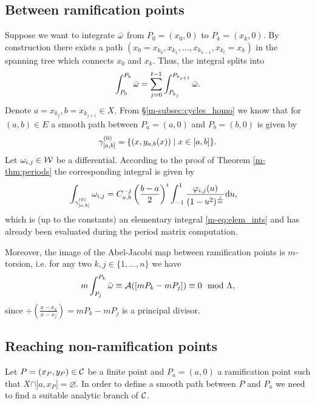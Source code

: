 \documentclass[main.tex]{subfiles}
\begin{document}
  \subsection{Between ramification points}\label{subsec:ajm_ram_pts}

  Suppose we want to integrate $\bar{\omega}$ from $P_0 =(x_0,0)$ to $P_k = (x_k,0)$. By construction there exists a path
 $(x_0=x_{k_0},x_{k_1},\dots,x_{k_{n-1}},x_{k_t}=x_k)$ in the spanning tree which connects $x_0$ and $x_k$. Thus, the integral splits into
  \begin{align*}
    \int_{P_0}^{P_k} \bar{\omega} = \sum_{j = 0}^{t-1}  \int_{P_{k_j}}^{P_{k_{j+1}}} \bar{\omega}.
  \end{align*}
  Denote $a = x_{k_j}, b = x_{k_{j+1}} \in X$. From \S \ref{m-subsec:cycles_homo} we know that for $(a,b) \in E$ a smooth path between $P_a=(a,0)$ and $P_b=(b,0)$ is given by
  \begin{align*}
   \gamma_{[a,b]}^{(0)} = \{  (x,y_{a,b}(x))  \mid  x \in [a,b]  \}.
  \end{align*}
  Let $\omega_{i,j} \in \mathcal{W}$ be a differential. According to the proof of Theorem \ref{m-thm:periods} the corresponding integral is given by
  \begin{align*}
   \int_{\gamma_{[a,b]}^{(0)}} \omega_{i,j}  & =
   C_{a,b}^{-j} \left(\frac{b-a}{2}\right)^i \int_{-1}^1 \frac{\varphi_{i,j}(u)}{(1-u^2)^{\frac{j}{m}}}  \mathrm d u,
  \end{align*}
  which is (up to the constants) an elementary integral \ref{m-eq:elem_ints}
  and has already been evaluated during the period matrix computation.

  \begin{rmk}
  Moreover, the image of the Abel-Jacobi map between ramification points is $m$-torsion, i.e. for any two $k,j \in \{1,\dots,n\}$ we have
  \begin{equation}\label{eq:m_tors}
    m \int_{P_j}^{P_k} \bar{\omega} \equiv \mathcal{A}( [ mP_k - mP_j ] ) \equiv 0 \mod  \Lambda,
  \end{equation}
  since $\div\left( \frac{x-x_k}{x-x_j} \right) = mP_k - mP_j$ is a principal divisor.
  \end{rmk}

  \subsection{Reaching non-ramification points}\label{subsec:ajm_finite}

  Let $P = (x_P,y_P) \in \mathcal{C}$ be a finite point and $P_a = (a,0)$ a ramification point such that $X\cap]a,x_P]=\varnothing$. In order to define a smooth path between $P$ and $P_a$
  we need to find a suitable analytic branch of $\mathcal{C}$.
\end{document}
